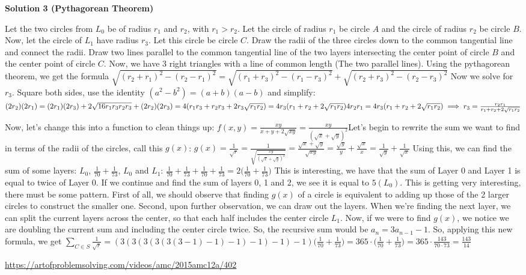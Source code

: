\begin{enumerate}
\textbf{Solution 3 (Pythagorean Theorem)}

Let the two circles from $L_0$ be of radius $r_1$ and $r_2$, with $r_1>r_2$. Let the circle of radius $r_1$ be circle $A$ and the circle of radius $r_2$ be circle $B$. Now, let the circle of $L_1$ have radius $r_3$. Let this circle be circle $C$. Draw the radii of the three circles down to the common tangential line and connect the radii. Draw two lines parallel to the common tangential line of the two layers intersecting the center point of circle $B$ and the center point of circle $C$. Now, we have $3$ right triangles with a line of common length (The two parallel lines). Using the pythagorean theorem, we get the formula $\sqrt{(r_2+r_1)^2-(r_2-r_1)^2}=\sqrt{(r_1+r_3)^2-(r_1-r_3)^2}+\sqrt{(r_2+r_3)^2-(r_2-r_3)^2}$ Now we solve for $r_3$. Square both sides, use the identity $(a^2-b^2)=(a+b)(a-b)$ and simplify: $(2r_2)(2r_1) = (2r_1)(2r_3)+2\sqrt{16r_1r_3r_2r_3}+(2r_2)(2r_3)=4(r_1r_3+r_2r_3+2r_3\sqrt{r_1r_2})=4r_3(r_1+r_2+2\sqrt{r_1r_2}) \\ 4r_2r_1=4r_3(r_1+r_2+2\sqrt{r_1r_2}) \implies r_3=\frac{r_2r_1}{r_1+r_2+2\sqrt{r_1r_2}}$

 
Now, let's change this into a function to clean things up: $f(x,y) = \frac{xy}{x+y+2\sqrt{xy}}=\frac{xy}{(\sqrt{x}+\sqrt{y})^2}$Let's begin to rewrite the sum we want to find in terms of the radii of the circles, call this $g(x)$: $g(x) = \frac{1}{\sqrt{r}}=\frac{1}{\sqrt{\frac{xy}{(\sqrt{x}+\sqrt{y})^2}}} = \frac{\sqrt{x}+\sqrt{y}}{\sqrt{xy}} = \frac{\sqrt{y}}{y}+\frac{\sqrt{x}}{x} = \frac{1}{\sqrt{y}}+\frac{1}{\sqrt{x}}$ Using this, we can find the sum of some layers: $L_0$, $\frac{1}{70}+\frac{1}{73}$, $L_0$ and $L_1$: $\frac{1}{70}+\frac{1}{73}+\frac{1}{70}+\frac{1}{73} = 2\bigg (\frac{1}{70}+\frac{1}{73} \bigg)$ This is interesting, we have that the sum of Layer 0 and Layer 1 is equal to twice of Layer 0. If we continue and find the sum of layers 0, 1 and 2, we see it is equal to $5(L_0)$. This is getting very interesting, there must be some pattern. First of all, we should observe that finding $g(x)$ of a circle is equivalent to adding up those of the 2 larger circles to construct the smaller one. Second, upon further observation, we can draw out the layers. When we're finding the next layer, we can split the current layers across the center, so that each half includes the center circle $L_1$. Now, if we were to find $g(x)$, we notice we are doubling the current sum and including the center circle twice. So, the recursive sum would be $a_n=3a_{n-1}-1$. So, applying this new formula, we get $\sum_{C \in S}\frac{1}{\sqrt{r}} = (3(3(3(3(3(3-1)-1)-1)-1)-1)-1)\bigg (\frac{1}{70}+\frac{1}{73} \bigg )=365\cdot \bigg (\frac{1}{70}+\frac{1}{73} \bigg)=365\cdot\frac{143}{70\cdot73}=\boxed{\frac{143}{14}}$

 \href{https://artofproblemsolving.com/videos/amc/2015amc12a/402}{https://artofproblemsolving.com/videos/amc/2015amc12a/402}

 


\end{enumerate}
